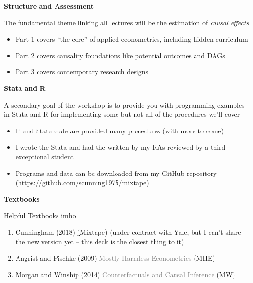 \documentclass[notes=show]{beamer}
\newcommand{\myurlshort}[2]{\href{#1}{\textcolor{gray}{\textsf{#2}}}}
\begin{document}
\begin{frame}[plain]
	\begin{center}
	\textbf{Structure and Assessment}
	\end{center}
	
The fundamental theme linking all lectures will be the estimation of \emph{causal effects}
	\begin{itemize}
	\item Part 1 covers ``the core'' of applied econometrics, including hidden curriculum
	\item Part 2 covers causality foundations like potential outcomes and DAGs
	\item Part 3 covers contemporary research designs
	\end{itemize}

\end{frame}

\begin{frame}[plain]
	\begin{center}
	\textbf{Stata and R}
	\end{center}
	
A secondary goal of the workshop is to provide you with programming examples in Stata and R for implementing some but not all of the procedures we'll cover
	\begin{itemize}
	\item R and Stata code are provided many procedures (with more to come)
	\item I wrote the Stata and had the written by my RAs reviewed by a third exceptional student
	\item Programs and data can be downloaded from my GitHub repository (https://github.com/scunning1975/mixtape)
	\end{itemize}
\end{frame}


\begin{frame}[plain]
	\begin{center}
	\textbf{Textbooks}
	\end{center}
	
Helpful Textbooks imho
		\begin{enumerate}
		\item Cunningham (2018) \myurlshort{http://www.scunning.com} (Mixtape) (under contract with Yale, but I can't share the new version yet -- this deck is the closest thing to it)
		\item Angrist and Pischke (2009) \myurlshort{http://www.amazon.com/Mostly-Harmless-Econometrics-Empiricists-Companion/dp/0691120358/}{Mostly Harmless Econometrics} (MHE)
		\item Morgan and Winship (2014) \myurlshort{http://www.amazon.com/Counterfactuals-Causal-Inference-Principles-Analytical/dp/1107694167//}{Counterfactuals and Causal Inference} (MW)
		\end{enumerate}
\end{frame}
\end{document}
